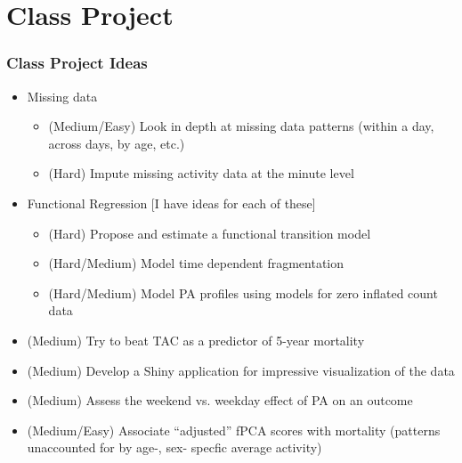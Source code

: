 \documentclass[10pt]{beamer}\usepackage[]{graphicx}\usepackage[]{color}
\begin{document}
% 



\section{Class Project}

\begin{frame}
\frametitle{Class Project Ideas}
\small
\begin{itemize}
\item Missing data
    \begin{itemize}
    \item (Medium/Easy) Look in depth at missing data patterns (within a day, across days, by age, etc.)
    \item (Hard) Impute missing activity data at the minute level
    \end{itemize}
\item Functional Regression [I have ideas for each of these]
    \begin{itemize}
    \item (Hard) Propose and estimate a functional transition model
    \item (Hard/Medium) Model time dependent fragmentation 
    \item (Hard/Medium) Model PA profiles using models for zero inflated count data
    \end{itemize}
\item (Medium) Try to beat TAC as a predictor of 5-year mortality
\item (Medium) Develop a Shiny application for impressive visualization of the data
\item (Medium) Assess the weekend vs. weekday effect of PA on an outcome
\item (Medium/Easy) Associate ``adjusted'' fPCA scores with mortality (patterns unaccounted for by age-, sex- specfic average activity) 
\end{itemize}
\end{frame}
\end{document}
